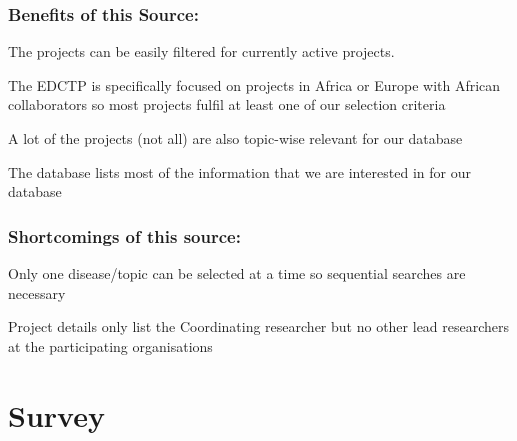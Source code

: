 \documentclass[
]{book}
\begin{document}
\hypertarget{benefits-of-this-source}{%
\subsection{Benefits of this Source:}\label{benefits-of-this-source}}

The projects can be easily filtered for currently active projects.

The EDCTP is specifically focused on projects in Africa or Europe with African collaborators so most projects fulfil at least one of our selection criteria

A lot of the projects (not all) are also topic-wise relevant for our database

The database lists most of the information that we are interested in for our database

\hypertarget{shortcomings-of-this-source}{%
\subsection{Shortcomings of this source:}\label{shortcomings-of-this-source}}

Only one disease/topic can be selected at a time so sequential searches are necessary

Project details only list the Coordinating researcher but no other lead researchers at the participating organisations

\hypertarget{survey}{%
\chapter{Survey}\label{survey}}

  
\end{document}
